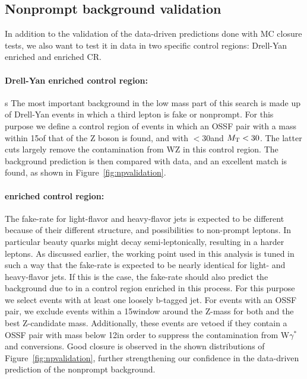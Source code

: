 \subsection{Nonprompt background validation}
In addition to the validation of the data-driven predictions done with MC closure tests, we also want
to test it in data in two specific control regions: Drell-Yan
enriched and \ttbar enriched CR.
\paragraph{Drell-Yan enriched
  control region:}s
The most important background in the low mass part of this search is
made up of Drell-Yan events in which a third lepton is fake or
nonprompt. For this purpose we define a control region of events in
which an OSSF pair with a mass within 15\GeV of that of the Z boson is
found, and with \ptmiss $< 30$\GeV and $M_{\mathrm{T}} < 30$\GeV . The latter
cuts largely remove the contamination from WZ in this control
region. The background prediction is then compared with data, and an excellent match is found, as shown in Figure~\ref{fig:npvalidation}. 

\paragraph{\texorpdfstring{\ttbar}{ttbar} enriched control region:}
The fake-rate for light-flavor and heavy-flavor jets is expected to be
different because of their different structure, and possibilities to
non-prompt leptons. In particular beauty quarks might decay
semi-leptonically, resulting in a harder leptons. As discussed earlier, the \fo working point used in this analysis is tuned in such a way that the fake-rate is expected to be nearly identical for light- and heavy-flavor jets. If this is the case, the fake-rate should also predict the background due to \ttbar  in a control region enriched in this process.
For this purpose we select events with at least one loosely b-tagged jet. 
For events with an OSSF pair, we exclude events within a 15\GeV window around the Z-mass for both \mlll  and the best Z-candidate mass. Additionally, these events are vetoed if they contain a \lo OSSF pair with mass below 12\GeV in order to suppress the contamination from W$\gamma^{*}$ and conversions. Good closure is observed in the shown distributions of Figure~\ref{fig:npvalidation}, further strengthening our confidence in the data-driven prediction of the nonprompt background.

